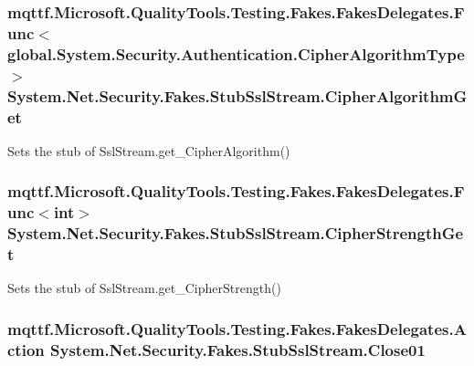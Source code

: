 \hypertarget{class_system_1_1_net_1_1_security_1_1_fakes_1_1_stub_ssl_stream_af8839705e312cc9bde3b6e155a41764e}{
\subsubsection[{Cipher\-Algorithm\-Get}]{\setlength{\rightskip}{0pt plus 5cm}mqttf.\-Microsoft.\-Quality\-Tools.\-Testing.\-Fakes.\-Fakes\-Delegates.\-Func$<$global.\-System.\-Security.\-Authentication.\-Cipher\-Algorithm\-Type$>$ System.\-Net.\-Security.\-Fakes.\-Stub\-Ssl\-Stream.\-Cipher\-Algorithm\-Get}}\label{class_system_1_1_net_1_1_security_1_1_fakes_1_1_stub_ssl_stream_af8839705e312cc9bde3b6e155a41764e}


Sets the stub of Ssl\-Stream.\-get\-\_\-\-Cipher\-Algorithm()

\hypertarget{class_system_1_1_net_1_1_security_1_1_fakes_1_1_stub_ssl_stream_a8a089b96f8848f9e68df0056846342a4}{
\subsubsection[{Cipher\-Strength\-Get}]{\setlength{\rightskip}{0pt plus 5cm}mqttf.\-Microsoft.\-Quality\-Tools.\-Testing.\-Fakes.\-Fakes\-Delegates.\-Func$<$int$>$ System.\-Net.\-Security.\-Fakes.\-Stub\-Ssl\-Stream.\-Cipher\-Strength\-Get}}\label{class_system_1_1_net_1_1_security_1_1_fakes_1_1_stub_ssl_stream_a8a089b96f8848f9e68df0056846342a4}


Sets the stub of Ssl\-Stream.\-get\-\_\-\-Cipher\-Strength()

\hypertarget{class_system_1_1_net_1_1_security_1_1_fakes_1_1_stub_ssl_stream_a62656660bbe8490871d18eecdb64c442}{
\subsubsection[{Close01}]{\setlength{\rightskip}{0pt plus 5cm}mqttf.\-Microsoft.\-Quality\-Tools.\-Testing.\-Fakes.\-Fakes\-Delegates.\-Action System.\-Net.\-Security.\-Fakes.\-Stub\-Ssl\-Stream.\-Close01}}\label{class_system_1_1_net_1_1_security_1_1_fakes_1_1_stub_ssl_stream_a62656660bbe8490871d18eecdb64c442}


